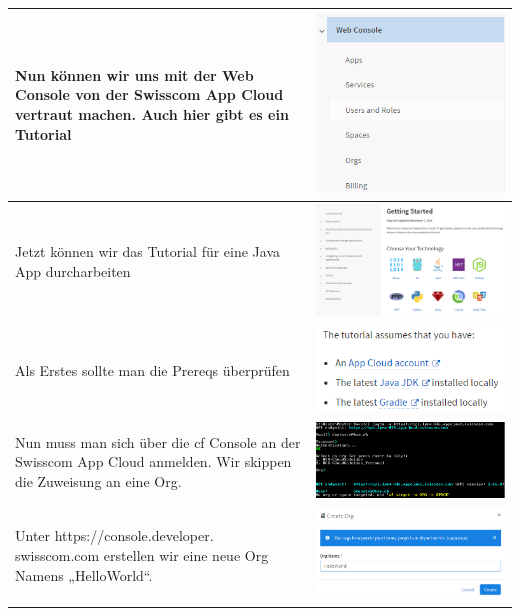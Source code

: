 \begin{longtable}{| p{5cm} | p{11cm} |}
Nun können wir uns mit der Web Console von der Swisscom App Cloud vertraut machen. Auch hier gibt es ein Tutorial 
&\includegraphics[width=0.4\columnwidth, valign=T]{images/image4.png} \\ \hline
Jetzt können wir das Tutorial für eine Java App durcharbeiten &\includegraphics[width=0.65\columnwidth, valign=T]{images/image1.png} \\ \hline
Als Erstes sollte man die Prereqs überprüfen 
&\includegraphics[width=0.5\columnwidth, valign=T]{images/image5.png} \\ \hline
Nun muss man sich über die cf Console an der Swisscom App Cloud anmelden. Wir skippen die Zuweisung an eine Org. 
&\includegraphics[width=0.65\columnwidth, valign=T]{images/image6.png} \\ \hline
Unter https://console.developer. swisscom.com erstellen wir eine neue Org Namens „HelloWorld“. &\includegraphics[width=0.65\columnwidth, valign=T]{images/image7.png} \\ \hline

\end{longtable}
